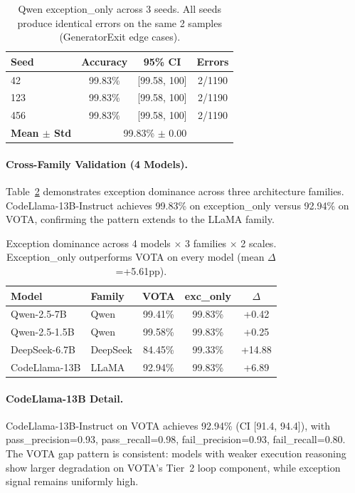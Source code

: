\documentclass[11pt,a4paper]{article}
\begin{document}
\begin{table}[t]
\centering
\small
\begin{tabular}{lccc}
\toprule
\textbf{Seed} & \textbf{Accuracy} & \textbf{95\% CI} & \textbf{Errors} \\
\midrule
42 & 99.83\% & [99.58, 100] & 2/1190 \\
123 & 99.83\% & [99.58, 100] & 2/1190 \\
456 & 99.83\% & [99.58, 100] & 2/1190 \\
\midrule
\textbf{Mean $\pm$ Std} & \multicolumn{3}{c}{99.83\% $\pm$ 0.00} \\
\bottomrule
\end{tabular}
\caption{Qwen exception\_only across 3 seeds. All seeds produce identical errors on the same 2 samples (GeneratorExit edge cases).}
\label{tab:qwen_seeds}
\end{table}

\paragraph{Cross-Family Validation (4 Models).} Table~\ref{tab:cross_family} demonstrates exception dominance across three architecture families. CodeLlama-13B-Instruct achieves 99.83\% on exception\_only versus 92.94\% on VOTA, confirming the pattern extends to the LLaMA family.

\begin{table}[t]
\centering
\small
\begin{tabular}{llccc}
\toprule
\textbf{Model} & \textbf{Family} & \textbf{VOTA} & \textbf{exc\_only} & \textbf{$\Delta$} \\
\midrule
Qwen-2.5-7B & Qwen & 99.41\% & 99.83\% & +0.42 \\
Qwen-2.5-1.5B & Qwen & 99.58\% & 99.83\% & +0.25 \\
DeepSeek-6.7B & DeepSeek & 84.45\% & 99.33\% & +14.88 \\
CodeLlama-13B & LLaMA & 92.94\% & 99.83\% & +6.89 \\
\bottomrule
\end{tabular}
\caption{Exception dominance across 4 models $\times$ 3 families $\times$ 2 scales. Exception\_only outperforms VOTA on every model (mean $\Delta$=+5.61pp).}
\label{tab:cross_family}
\end{table}

\paragraph{CodeLlama-13B Detail.} CodeLlama-13B-Instruct on VOTA achieves 92.94\% (CI [91.4, 94.4]), with pass\_precision=0.93, pass\_recall=0.98, fail\_precision=0.93, fail\_recall=0.80. The VOTA gap pattern is consistent: models with weaker execution reasoning show larger degradation on VOTA's Tier~2 loop component, while exception signal remains uniformly high.
\end{document}
